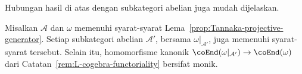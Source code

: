 
Hubungan hasil di atas dengan subkategori abelian juga mudah dijelaskan.

\begin{lemma}\label{prop:subcat-gen-L}
	Misalkan $\mathcal{A}$ dan $\omega$ memenuhi syarat-syarat
	Lema~\ref{prop:Tannaka-projective-generator}. Setiap subkategori abelian
	$\mathcal{A}'$, bersama $\omega|_{\mathcal{A}'}$, juga memenuhi
	syarat-syarat tersebut. Selain itu, homomorfisme kanonik
	$\coEnd(\omega|_{\mathcal{A}'})\to\coEnd(\omega)$ dari
	Catatan~\ref{rem:L-cogebra-functoriality} bersifat monik.
\end{lemma}
